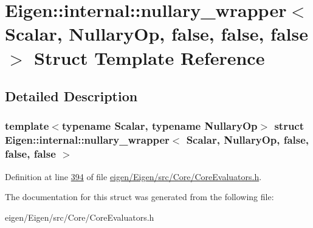 \hypertarget{struct_eigen_1_1internal_1_1nullary__wrapper_3_01_scalar_00_01_nullary_op_00_01false_00_01false_00_01false_01_4}{}\section{Eigen\+:\+:internal\+:\+:nullary\+\_\+wrapper$<$ Scalar, Nullary\+Op, false, false, false $>$ Struct Template Reference}
\label{struct_eigen_1_1internal_1_1nullary__wrapper_3_01_scalar_00_01_nullary_op_00_01false_00_01false_00_01false_01_4}


\subsection{Detailed Description}
\subsubsection*{template$<$typename Scalar, typename Nullary\+Op$>$\newline
struct Eigen\+::internal\+::nullary\+\_\+wrapper$<$ Scalar, Nullary\+Op, false, false, false $>$}



Definition at line \hyperlink{eigen_2_eigen_2src_2_core_2_core_evaluators_8h_source_l00394}{394} of file \hyperlink{eigen_2_eigen_2src_2_core_2_core_evaluators_8h_source}{eigen/\+Eigen/src/\+Core/\+Core\+Evaluators.\+h}.



The documentation for this struct was generated from the following file\+:\begin{DoxyCompactItemize}
\item 
eigen/\+Eigen/src/\+Core/\+Core\+Evaluators.\+h\end{DoxyCompactItemize}

